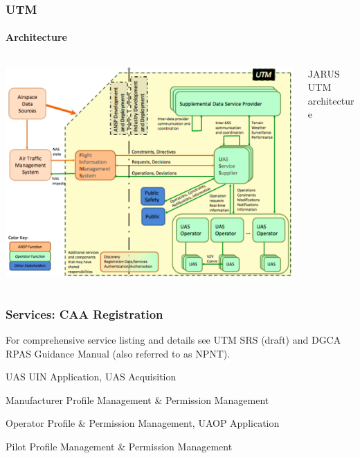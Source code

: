 \documentclass[usenames,dvipsnames,aspectratio=169,serif]{beamer}
\begin{document}
\begin{frame}
   \frametitle{UTM}
   \framesubtitle{Architecture}
   \begin{columns}[T]
      \begin{column}{0.6\textwidth}
         \includegraphics[height=0.75\textheight]{img/utm-architecture.png}
      \end{column}
      \begin{column}{0.4\textwidth}
         JARUS UTM architecture \cite{JARUS-SORA/JAR-DEL-WG6-D.04}
      \end{column}
   \end{columns}

\end{frame}


\begin{frame}
   \frametitle{Services: CAA Registration}
   For comprehensive service listing and details see UTM SRS (draft) \cite{UTMWG-SRS} and DGCA RPAS Guidance Manual \cite{RPASGM2020} (also referred to as NPNT).
   \begin{block}{UAS}
      UIN Application, UAS Acquisition
   \end{block}

   \begin{block}{Manufacturer}
      Profile Management \& Permission Management
   \end{block}

   \begin{block}{Operator}
      Profile \& Permission Management, UAOP Application
   \end{block}

   \begin{block}{Pilot}
      Profile Management \& Permission Management
   \end{block}
\end{frame}
\end{document}
